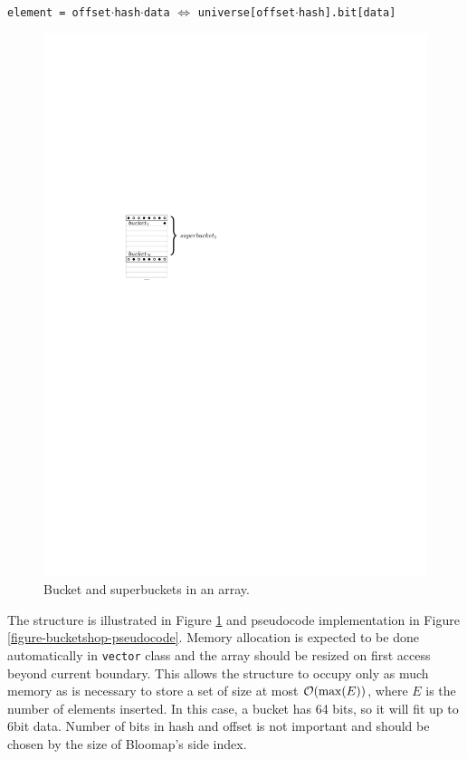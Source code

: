 \begin{center}
	{\tt element = offset$\cdot$hash$\cdot$data} $\Leftrightarrow$
	{\tt universe[offset$\cdot$hash].bit[data]}
\end{center}

\begin{figure}[!ht]
	\centering\hspace{2.5cm}
	\includegraphics{img/bucketshop.pdf}
	\caption{Bucket and superbuckets in an array.}
	\label{figure-bucketshop}
\end{figure}

The structure is illustrated in Figure \ref{figure-bucketshop} and pseudocode
implementation in Figure \ref{figure-bucketshop-pseudocode}. Memory allocation
is expected to be done automatically in {\tt vector} class and the array should
be resized on first access beyond current boundary.  This allows the structure
to occupy only as much memory as is necessary to store a set of size at most
$\mathcal{O}(\max(E))$, where $E$ is the number of elements inserted. In this case, a
bucket has 64 bits, so it will fit up to 6bit data. Number of bits in hash and
offset is not important and should be chosen by the size of Bloomap's side
index.

